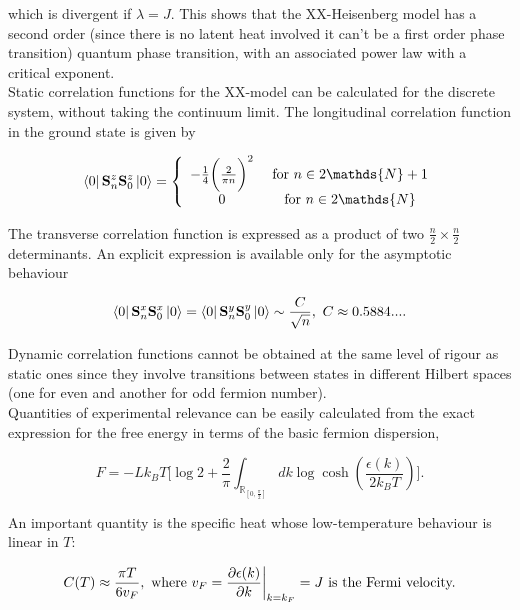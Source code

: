 \documentclass{homework}
\begin{document}
which is divergent if $\lambda = J$. This shows that the XX-Heisenberg model has a second order (since there is no latent heat involved it can't be a first order phase transition) quantum phase transition, with an associated power law with a critical exponent.  \\

Static correlation functions for the XX-model can be calculated for the discrete system, without taking the continuum limit. The longitudinal correlation function in the ground state is given by 

$$
\bra{0} {\spin}_n^z {\spin}_0^z \ket{0} = \left\{ \begin{array}{cc}
     - \frac{1}{4} \bigg(\frac{2}{\pi n}\bigg)^2 & \textnormal{ for $n \in 2\mathds{N}+1$}  \\
     0  & \textnormal{ for $ n \in 2\mathds{N}$} 
\end{array} \right.
$$

The transverse correlation function is expressed as a product of two $\frac{n}{2} \times \frac{n}{2}$ determinants. An explicit expression is available only for the asymptotic behaviour 

$$
\bra{0} {{\bf S}}_n^x {{\bf S}}_0^x \ket{0} = \bra{0} {{\bf S}}_n^y {{\bf S}}_0^y \ket{0} \sim \frac{C}{\sqrt{n}}, \textnormal{ } C \approx 0.5884....
$$

Dynamic correlation functions cannot be obtained at the same level of rigour as static ones since they involve transitions between states in different Hilbert spaces (one for even and another for odd fermion number). \\

Quantities of experimental relevance can be easily calculated from the exact expression for the free energy in terms of the basic fermion dispersion, 

\begin{equation}
    F = - L k_B T \bigg[\log 2 + \frac{2}{\pi} \int_{\mathds{R}_{[0, \frac{\pi}{2}]}} dk \log \cosh \left(\frac{\epsilon(k)}{2k_B T}\right)\bigg].
\end{equation}

An important quantity is the specific heat whose low-temperature behaviour is linear in $T$:

$$
C(T) \approx \frac{\pi T}{6 v_F}, \textnormal{ where } v_F = \frac{\partial \epsilon(k)}{\partial k}\bigg|_{k = k_F} = J \textnormal{ is the Fermi velocity.} 
$$
\end{document}
